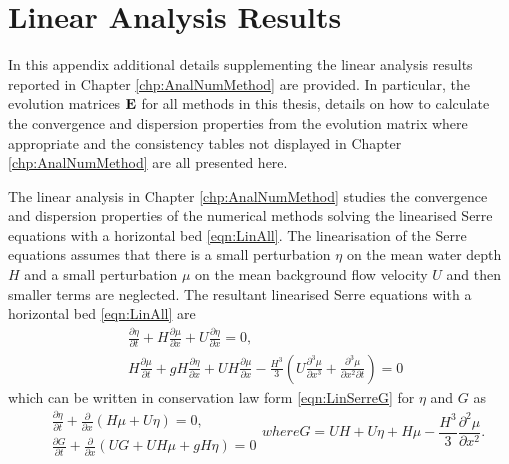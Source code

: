 \chapter{Linear Analysis Results}
\label{app:LinAnal}
In this appendix additional details supplementing the linear analysis results reported in Chapter \ref{chp:AnalNumMethod} are provided. In particular, the evolution matrices $\mathbf{E}$ for all methods in this thesis, details on how to calculate the convergence and dispersion properties from the evolution matrix where appropriate and the consistency tables not displayed in Chapter \ref{chp:AnalNumMethod} are all presented here.

The linear analysis in Chapter \ref{chp:AnalNumMethod} studies the convergence and dispersion properties of the numerical methods solving the linearised Serre equations with a horizontal bed \eqref{eqn:LinAll}. The linearisation of the Serre equations assumes that there is a small perturbation $\eta$ on the mean water depth $H$ and a small perturbation $\mu$ on the mean background flow velocity $U$ and then smaller terms are neglected. The resultant linearised Serre equations with a horizontal bed \eqref{eqn:LinAll} are
\begin{subequations}
	\label{appC:Lin}
	\begin{align}
	&\frac{\partial  \eta}{\partial  t} + H\frac{\partial \mu}{\partial  x} + U\frac{\partial  \eta}{\partial  x}  = 0, \\
	&H\frac{\partial  \mu}{\partial  t} + gH\frac{\partial  \eta}{\partial  x} + UH\frac{\partial  \mu}{\partial  x} - \frac{H^3}{3}\left(U\frac{\partial^3  \mu}{\partial  x^3} + \frac{\partial^3  \mu}{\partial  x^2 \partial  t}  \right)  = 0
	\end{align}	
\end{subequations}
which can be written in conservation law form \eqref{eqn:LinSerreG} for $\eta$ and $G$ as
\begin{subequations}
	\label{appC:ConLawFormLin}
	\begin{align}
	&\frac{\partial  \eta}{\partial  t} +\frac{\partial}{\partial  x} \left(H\mu + U \eta\right) = 0, \\
	&\frac{\partial  G}{\partial  t} + \frac{\partial}{\partial  x}\left(UG + UH\mu + gH \eta\right) = 0
	\end{align}
	where
	\begin{equation}
	G = UH + U \eta + H \mu -\frac{H^3}{3} \frac{\partial^2 \mu }{\partial x^2}.
	\end{equation}
\end{subequations}

